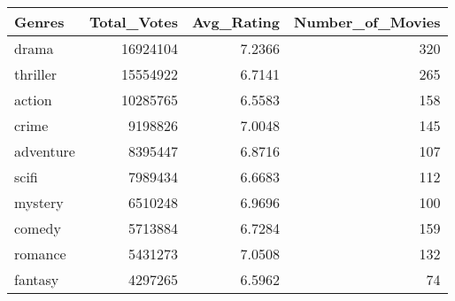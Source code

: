 \begin{tabular}{lrrr}
\toprule
Genres & Total_Votes & Avg_Rating & Number_of_Movies \\
\midrule
drama & 16924104 & 7.2366 & 320 \\
thriller & 15554922 & 6.7141 & 265 \\
action & 10285765 & 6.5583 & 158 \\
crime & 9198826 & 7.0048 & 145 \\
adventure & 8395447 & 6.8716 & 107 \\
scifi & 7989434 & 6.6683 & 112 \\
mystery & 6510248 & 6.9696 & 100 \\
comedy & 5713884 & 6.7284 & 159 \\
romance & 5431273 & 7.0508 & 132 \\
fantasy & 4297265 & 6.5962 & 74 \\
\bottomrule
\end{tabular}
